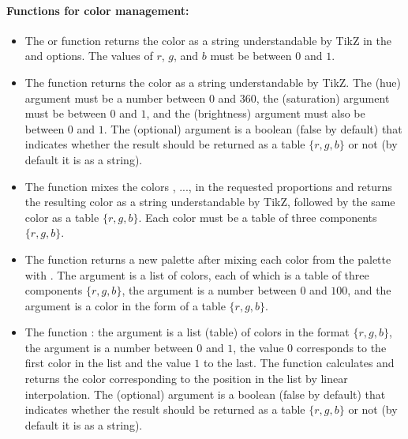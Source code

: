 \paragraph{Functions for color management:}
\begin{itemize}
    \item The  or  function returns the color as a string understandable by TikZ in the  and  options. The values ​​of $r$, $g$, and $b$ must be between $0$ and $1$.

    \item The  function returns the color as a string understandable by TikZ. The  (hue) argument must be a number between $0$ and $360$, the  (saturation) argument must be between $0$ and $1$, and the  (brightness) argument must also be between $0$ and $1$. The (optional) argument  is a boolean (false by default) that indicates whether the result should be returned as a table $\{r,g,b\}$ or not (by default it is as a string).

    \item The function  mixes the colors , ..., in the requested proportions and returns the resulting color as a string understandable by TikZ, followed by the same color as a table $\{r,g,b\}$. Each color must be a table of three components $\{r,g,b\}$.
    
    \item The function  returns a new palette after mixing each color from the palette  with . The argument  is a list of colors, each of which is a table of three components $\{r,g,b\}$, the argument  is a number between $0$ and $100$, and the argument  is a color in the form of a table $\{r,g,b\}$.

    \item The function : the argument  is a list (table) of colors in the format $\{r,g,b\}$, the argument  is a number between $0$ and $1$, the value $0$ corresponds to the first color in the list and the value $1$ to the last. The function calculates and returns the color corresponding to the position  in the list by linear interpolation. The (optional) argument  is a boolean (false by default) that indicates whether the result should be returned as a table $\{r,g,b\}$ or not (by default it is as a string).


\end{itemize}
